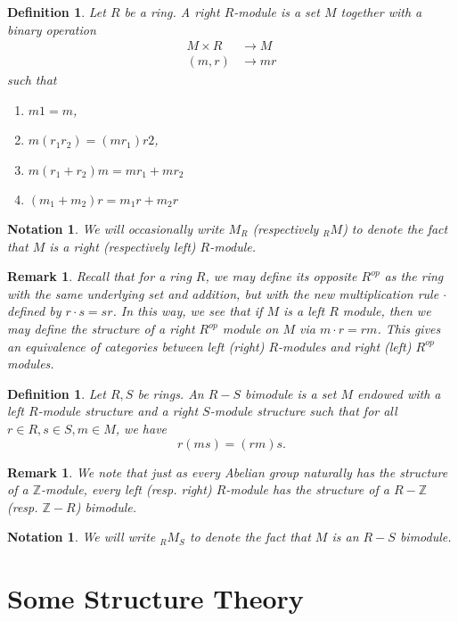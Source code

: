 \documentclass[12pt]{report}
\theoremstyle{plain}
\newtheorem{defn}[thm]{Definition}
\newtheorem{notn}[thm]{Notation}
\newtheorem{rem}[thm]{Remark}
\newcommand{\ZZ}{\mathbb{Z}}
\newcommand{\X}[1]{#1\index{#1}}
\begin{document}
\begin{defn}
Let $R$ be a ring. A right $R$-module is a set $M$ together with a binary
operation
\begin{align*}
M \times R &\to M \\
(m, r) &\to mr
\end{align*}
such that
\begin{enumerate}[1. ]
\item $m 1 = m$, 
\item $m (r_1 r_2) = (m r_1) r2$, 
\item $m (r_1 + r_2)m = m r_1 + m r_2$
\item $(m_1 + m_2)r = m_1 r + m_2 r$
\end{enumerate}
\end{defn}

\begin{notn}
We will occasionally write $M_R$ (respectively $_R M$) to denote the fact
that $M$ is a right (respectively left) $R$-module.
\end{notn}

\begin{rem}
Recall that for a ring $R$, we may define its opposite $R^{op}$ as the ring
with the same underlying set and addition, but with the new multiplication
rule $\cdot$ defined by $r \cdot s = sr$. In this way, we see
that if $M$ is a left $R$ module, then we may define the structure of a
right $R^{op}$ module on $M$ via $m \cdot r = rm$. This gives an
equivalence of categories between left (right) $R$-modules and right (left)
$R^{op}$ modules.
\end{rem}

\begin{defn}
Let $R, S$ be rings. An $R-S$ \X{bimodule} is a set $M$ endowed with a left
$R$-module structure and a right $S$-module structure such that for all $r
\in R, s \in S, m \in M$, we have
\[ r(m s) = (r m) s.\]
\end{defn}

\begin{rem}
We note that just as every Abelian group naturally has the structure of a
$\ZZ$-module, every left (resp. right) $R$-module has the structure of a
$R-\ZZ$ (resp. $\ZZ - R$) bimodule.
\end{rem}

\begin{notn}
We will write $_R M_S$ to denote the fact that $M$ is an $R-S$ bimodule.
\end{notn}


\section{Some Structure Theory}
\end{document}
